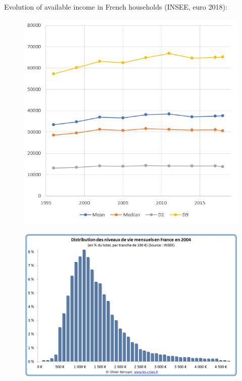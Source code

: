 \documentclass[compress]{beamer}
\begin{document}
\begin{frame}
	Evolution of available income in French households (INSEE, euro 2018):
	\begin{figure}
		\centering
		\includegraphics[scale=0.65]{Picture/french household income.PNG}
	\end{figure}
\end{frame}

\begin{frame}
	\begin{figure}
		\centering
		\includegraphics[scale=0.2]{Picture/distribution-niveaux-de-vie-mensuels.jpg}
	\end{figure}
\end{frame}
\end{document}
